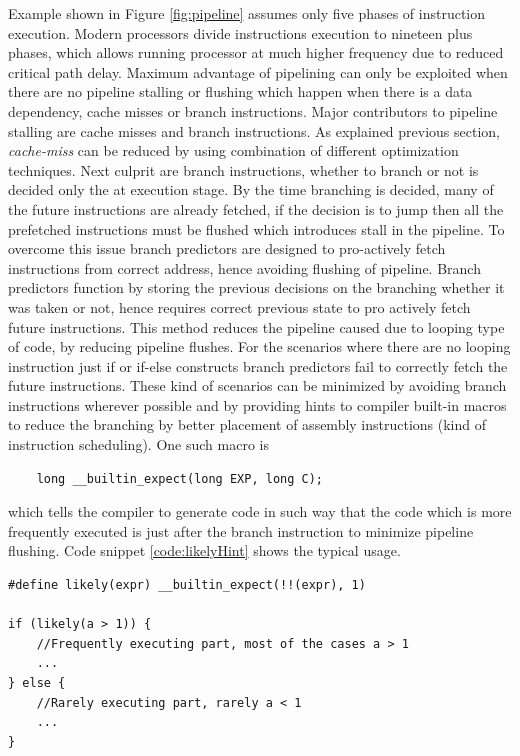 Example shown in Figure \ref{fig:pipeline} assumes only five phases of instruction execution. Modern processors divide instructions execution to nineteen plus phases, which allows running processor at much higher frequency due to reduced critical path delay. Maximum advantage of pipelining can only be exploited when there are no pipeline stalling or flushing which happen when there is a data dependency, cache misses or branch instructions. Major contributors to pipeline stalling are cache misses and branch instructions. As explained previous section, \emph{cache-miss} can be reduced by using combination of different optimization techniques. Next culprit are branch instructions, whether to branch or not is decided only the at execution stage. By the time branching is decided, many of the future instructions are already fetched, if the decision is to jump then all the prefetched instructions must be flushed which introduces stall in the pipeline. To overcome this issue branch predictors are designed to pro-actively fetch instructions from correct address, hence avoiding flushing of pipeline. Branch predictors function by storing the previous decisions on the branching whether it was taken or not, hence requires correct previous state to pro actively fetch future instructions. This method reduces the pipeline caused due to looping type of code, by reducing pipeline flushes. For the scenarios where there are no looping instruction just if or if-else constructs branch predictors fail to correctly fetch the future instructions. These kind of scenarios can be minimized by avoiding branch instructions wherever possible and by providing hints to compiler built-in macros to reduce the branching by better placement of assembly instructions (kind of instruction scheduling). One such macro is 
\begin{verbatim}
	long __builtin_expect(long EXP, long C); 
\end{verbatim}
which tells the compiler to generate code in such way that the code which is more frequently executed is just after the branch instruction to minimize pipeline flushing. Code snippet \ref{code:likelyHint} shows the typical usage.

\begin{code}
	\label{code:likelyHint}
\begin{verbatim}
#define likely(expr) __builtin_expect(!!(expr), 1)

if (likely(a > 1)) {
  	//Frequently executing part, most of the cases a > 1
	...
} else {
	//Rarely executing part, rarely a < 1
	...
}
\end{verbatim}
\end{code}

